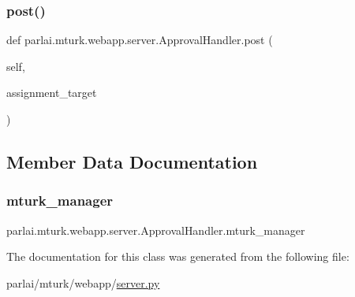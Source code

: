 \subsubsection{\texorpdfstring{post()}{post()}}
{\footnotesize\ttfamily def parlai.\+mturk.\+webapp.\+server.\+Approval\+Handler.\+post (\begin{DoxyParamCaption}\item[{}]{self,  }\item[{}]{assignment\+\_\+target }\end{DoxyParamCaption})}



\subsection{Member Data Documentation}
\mbox{\label{classparlai_1_1mturk_1_1webapp_1_1server_1_1ApprovalHandler_ac6cbcc9f89912ecbd3b9c677e44225b1}} 
\subsubsection{\texorpdfstring{mturk\+\_\+manager}{mturk\_manager}}
{\footnotesize\ttfamily parlai.\+mturk.\+webapp.\+server.\+Approval\+Handler.\+mturk\+\_\+manager}



The documentation for this class was generated from the following file\+:\begin{DoxyCompactItemize}
\item 
parlai/mturk/webapp/\hyperlink{server_8py}{server.\+py}\end{DoxyCompactItemize}
